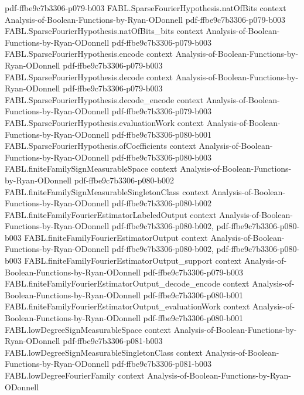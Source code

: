 \begin{theorem}
  {pdf-ffbe9c7b3306-p079-b003}
\proofstep
  {FABL.SparseFourierHypothesis.natOfBits}
  {context}
  {Analysis-of-Boolean-Functions-by-Ryan-ODonnell}
  {pdf-ffbe9c7b3306-p079-b003}
\proofstep
  {FABL.SparseFourierHypothesis.natOfBits_bits}
  {context}
  {Analysis-of-Boolean-Functions-by-Ryan-ODonnell}
  {pdf-ffbe9c7b3306-p079-b003}
\proofstep
  {FABL.SparseFourierHypothesis.encode}
  {context}
  {Analysis-of-Boolean-Functions-by-Ryan-ODonnell}
  {pdf-ffbe9c7b3306-p079-b003}
\proofstep
  {FABL.SparseFourierHypothesis.decode}
  {context}
  {Analysis-of-Boolean-Functions-by-Ryan-ODonnell}
  {pdf-ffbe9c7b3306-p079-b003}
\proofstep
  {FABL.SparseFourierHypothesis.decode_encode}
  {context}
  {Analysis-of-Boolean-Functions-by-Ryan-ODonnell}
  {pdf-ffbe9c7b3306-p079-b003}
\proofstep
  {FABL.SparseFourierHypothesis.evaluationWork}
  {context}
  {Analysis-of-Boolean-Functions-by-Ryan-ODonnell}
  {pdf-ffbe9c7b3306-p080-b001}
\proofstep
  {FABL.SparseFourierHypothesis.ofCoefficients}
  {context}
  {Analysis-of-Boolean-Functions-by-Ryan-ODonnell}
  {pdf-ffbe9c7b3306-p080-b003}
\proofstep
  {FABL.finiteFamilySignMeasurableSpace}
  {context}
  {Analysis-of-Boolean-Functions-by-Ryan-ODonnell}
  {pdf-ffbe9c7b3306-p080-b002}
\proofstep
  {FABL.finiteFamilySignMeasurableSingletonClass}
  {context}
  {Analysis-of-Boolean-Functions-by-Ryan-ODonnell}
  {pdf-ffbe9c7b3306-p080-b002}
\proofstep
  {FABL.finiteFamilyFourierEstimatorLabeledOutput}
  {context}
  {Analysis-of-Boolean-Functions-by-Ryan-ODonnell}
  {pdf-ffbe9c7b3306-p080-b002,
    pdf-ffbe9c7b3306-p080-b003}
\proofstep
  {FABL.finiteFamilyFourierEstimatorOutput}
  {context}
  {Analysis-of-Boolean-Functions-by-Ryan-ODonnell}
  {pdf-ffbe9c7b3306-p080-b002,
    pdf-ffbe9c7b3306-p080-b003}
\proofstep
  {FABL.finiteFamilyFourierEstimatorOutput_support}
  {context}
  {Analysis-of-Boolean-Functions-by-Ryan-ODonnell}
  {pdf-ffbe9c7b3306-p079-b003}
\proofstep
  {FABL.finiteFamilyFourierEstimatorOutput_decode_encode}
  {context}
  {Analysis-of-Boolean-Functions-by-Ryan-ODonnell}
  {pdf-ffbe9c7b3306-p080-b001}
\proofstep
  {FABL.finiteFamilyFourierEstimatorOutput_evaluationWork}
  {context}
  {Analysis-of-Boolean-Functions-by-Ryan-ODonnell}
  {pdf-ffbe9c7b3306-p080-b001}
\proofstep
  {FABL.lowDegreeSignMeasurableSpace}
  {context}
  {Analysis-of-Boolean-Functions-by-Ryan-ODonnell}
  {pdf-ffbe9c7b3306-p081-b003}
\proofstep
  {FABL.lowDegreeSignMeasurableSingletonClass}
  {context}
  {Analysis-of-Boolean-Functions-by-Ryan-ODonnell}
  {pdf-ffbe9c7b3306-p081-b003}
\proofstep
  {FABL.lowDegreeFourierFamily}
  {context}
  {Analysis-of-Boolean-Functions-by-Ryan-ODonnell}

\end{theorem}

